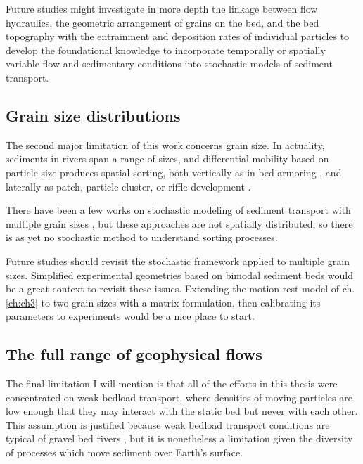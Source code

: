 Future studies might investigate in more depth the linkage between flow hydraulics, the geometric arrangement of grains on the bed, and the bed topography with the entrainment and deposition rates of individual particles to develop the foundational knowledge to incorporate temporally or spatially variable flow and sedimentary conditions into stochastic models of sediment transport.

\subsection{Grain size distributions}

The second major limitation of this work concerns grain size.
In actuality, sediments in rivers span a range of sizes, and differential mobility based on particle size produces spatial sorting, both vertically as in bed armoring \citep{Parker1982,Wilcock1989,Aberle2006}, and laterally as patch, particle cluster, or riffle development \citep{Nelson2014,Venditti2017}.

There have been a few works on stochastic modeling of sediment transport with multiple grain sizes \citep{Sun2000,Parker2000}, but these approaches are not spatially distributed, so there is as yet no stochastic method to understand sorting processes. 

Future studies should revisit the stochastic framework applied to multiple grain sizes. Simplified experimental geometries based on bimodal sediment beds \citep[e.g.][]{Houssais2012} would be a great context to revisit these issues. Extending the motion-rest model of ch. \ref{ch:ch3} to two grain sizes with a matrix formulation, then calibrating its parameters to experiments would be a nice place to start.

\subsection{The full range of geophysical flows}

The final limitation I will mention is that all of the efforts in this thesis were concentrated on weak bedload transport, where densities of moving particles are low enough that they may interact with the static bed but never with each other. This assumption is justified because weak bedload transport conditions are typical of gravel bed rivers \citep{Ashworth1989,Warburton1992}, but it is nonetheless a limitation given the diversity of processes which move sediment over Earth's surface.

